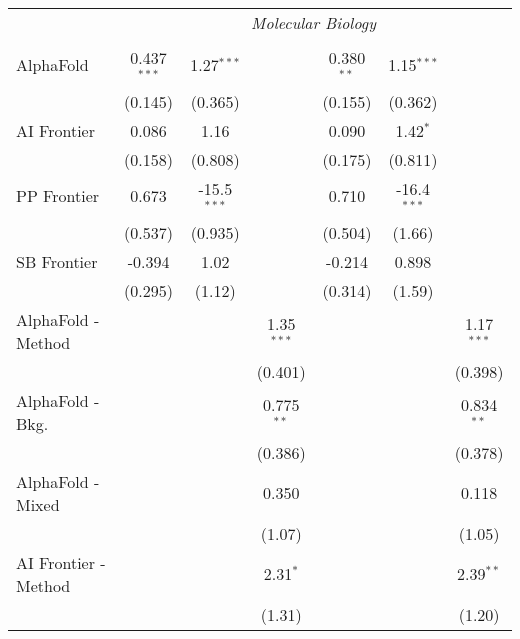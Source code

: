 \begin{tabular}{lcccccc}
 & \multicolumn{6}{c}{\textit{Molecular Biology}} \\ \\
   AlphaFold            & 0.437$^{***}$ & 1.27$^{***}$  &               & 0.380$^{**}$ & 1.15$^{***}$  &   \\   
                        & (0.145)       & (0.365)       &               & (0.155)      & (0.362)       &   \\   
   AI Frontier          & 0.086         & 1.16          &               & 0.090        & 1.42$^{*}$    &   \\   
                        & (0.158)       & (0.808)       &               & (0.175)      & (0.811)       &   \\   
   PP Frontier          & 0.673         & -15.5$^{***}$ &               & 0.710        & -16.4$^{***}$ &   \\   
                        & (0.537)       & (0.935)       &               & (0.504)      & (1.66)        &   \\   
   SB Frontier          & -0.394        & 1.02          &               & -0.214       & 0.898         &   \\   
                        & (0.295)       & (1.12)        &               & (0.314)      & (1.59)        &   \\   
   AlphaFold - Method   &               &               & 1.35$^{***}$  &              &               & 1.17$^{***}$\\   
                        &               &               & (0.401)       &              &               & (0.398)\\   
   AlphaFold - Bkg.     &               &               & 0.775$^{**}$  &              &               & 0.834$^{**}$\\   
                        &               &               & (0.386)       &              &               & (0.378)\\   
   AlphaFold - Mixed    &               &               & 0.350         &              &               & 0.118\\   
                        &               &               & (1.07)        &              &               & (1.05)\\   
   AI Frontier - Method &               &               & 2.31$^{*}$    &              &               & 2.39$^{**}$\\   
                        &               &               & (1.31)        &              &               & (1.20)\\   

\end{tabular}
